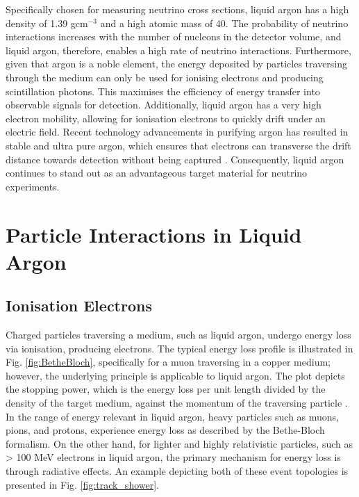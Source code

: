 Specifically chosen for measuring neutrino cross sections, liquid argon has a high density of 1.39 gcm$^{-3}$ and a high atomic mass of 40.
The probability of neutrino interactions increases with the number of nucleons in the detector volume, and liquid argon, therefore, enables a high rate of neutrino interactions.
Furthermore, given that argon is a noble element, the energy deposited by particles traversing through the medium can only be used for ionising electrons and producing scintillation photons.
This maximises the efficiency of energy transfer into observable signals for detection.
Additionally, liquid argon has a very high electron mobility, allowing for ionisation electrons to quickly drift under an electric field.
Recent technology advancements in purifying argon has resulted in stable and ultra pure argon, which ensures that electrons can transverse the drift distance towards detection without being captured \cite{ubooneEtime}.
Consequently, liquid argon continues to stand out as an advantageous target material for neutrino experiments. 


\section{Particle Interactions in Liquid Argon}
\label{sec3:creation}

\subsection{Ionisation Electrons}
\label{sec3:bethebloch}

Charged particles traversing a medium, such as liquid argon, undergo energy loss via ionisation, producing electrons. 
The typical energy loss profile is illustrated in Fig. \ref{fig:BetheBloch}, specifically for a muon traversing in a copper medium; however, the underlying principle is applicable to liquid argon.
The plot depicts the stopping power, which is the energy loss per unit length divided by the density of the target medium, against the momentum of the traversing particle \cite{Passage}.
In the range of energy relevant in liquid argon, heavy particles such as muons, pions, and protons, experience energy loss as described by the Bethe-Bloch formalism.
On the other hand, for lighter and highly relativistic particles, such as > 100 MeV electrons in liquid argon, the primary mechanism for energy loss is through radiative effects.
An example depicting both of these event topologies is presented in Fig. \ref{fig:track_shower}.

